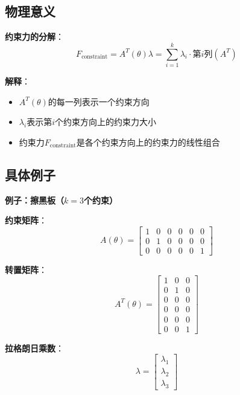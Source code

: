 \documentclass[12pt,a4paper]{article}
\begin{document}
\subsection{物理意义}

\textbf{约束力的分解}：
\begin{equation}
F_{\text{constraint}} = A^T(\theta)\lambda = \sum_{i=1}^k \lambda_i \cdot \text{第$i$列}(A^T)
\end{equation}

\textbf{解释}：
\begin{itemize}
\item $A^T(\theta)$的每一列表示一个约束方向
\item $\lambda_i$表示第$i$个约束方向上的约束力大小
\item 约束力$F_{\text{constraint}}$是各个约束方向上的约束力的线性组合
\end{itemize}

\subsection{具体例子}

\textbf{例子：擦黑板（$k = 3$个约束）}

\textbf{约束矩阵}：
\begin{equation}
A(\theta) = \begin{bmatrix}
1 & 0 & 0 & 0 & 0 & 0 \\  %
0 & 1 & 0 & 0 & 0 & 0 \\  %
0 & 0 & 0 & 0 & 0 & 1     %
\end{bmatrix}
\end{equation}

\textbf{转置矩阵}：
\begin{equation}
A^T(\theta) = \begin{bmatrix}
1 & 0 & 0 \\
0 & 1 & 0 \\
0 & 0 & 0 \\
0 & 0 & 0 \\
0 & 0 & 0 \\
0 & 0 & 1
\end{bmatrix}
\end{equation}

\textbf{拉格朗日乘数}：
\begin{equation}
\lambda = \begin{bmatrix}
\lambda_1 \\  %
\lambda_2 \\  %
\lambda_3     %
\end{bmatrix}
\end{equation}
\end{document}
